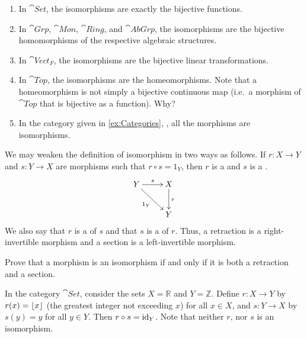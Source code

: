 \begin{Example}
\begin{enumerate}
\item In $\cat{Set}$, the isomorphisms are exactly the bijective functions.
\item In $\cat{Grp}$, $\cat{Mon}$, $\cat{Ring}$, and $\cat{AbGrp}$, the isomorphisms are the bijective homomorphisms of the respective algebraic structures.
\item In $\cat{Vect}_F$, the isomorphisms are the bijective linear transformations.
\item In $\cat{Top}$, the isomorphisms are the homeomorphisms. Note that a homeomorphism is not simply a bijective continuous map (i.e.\ a morphism of $\cat{Top}$ that is bijective as a function). Why?
\item In the category given in \cref{ex:Categories}, , all the morphisms are isomorphisms.
\end{enumerate}
\end{Example}

We may weaken the definition of isomorphism in two ways as follows. If $r \colon X \to Y$ and $s \colon Y \to X$ are morphisms such that $r \circ s = 1_Y$, then $r$ is a  and $s$ is a .
\begin{equation*}
\xymatrix{
Y \ar[r]^s \ar[rd]_{1_Y} & X \ar[d]^r \\
& Y
}
\end{equation*}
We also say that $r$ is a  of $s$ and that $s$ is a  of $r$. Thus, a retraction is a right-invertible morphism and a section is a left-invertible morphism.

\begin{Exercise}
Prove that a morphism is an isomorphism if and only if it is both a retraction and a section.


\end{Exercise}

\begin{Example}\label{ex:SetRetSec}
In the category $\cat{Set}$, consider the sets $X = \mathbb R$ and $Y = \mathbb Z$. Define $r \colon X \to Y$ by $r(x) = \lfloor x\rfloor$ (the greatest integer not exceeding $x$) for all $x \in X$, and $s \colon Y \to X$ by $s(y) = y$ for all $y \in Y$. Then $r \circ s = \mathrm{id}_Y$. Note that neither $r$, nor $s$ is an isomorphism.
\end{Example}

